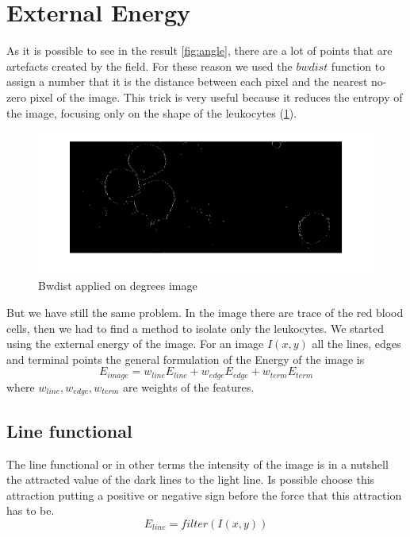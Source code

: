 \section{External Energy}
As it is possible to see in the result \ref{fig:angle}, there are a lot of points that are artefacts created by the field. For these reason we used the $bwdist$ function to assign a number that it is the distance between each pixel and the nearest no-zero pixel of the image. This trick is very useful because it reduces the entropy of the image, focusing only on the shape of the leukocytes (\ref{fig:bwdistangle}).
\begin{figure}
	\begin{center}
		\centering
		\includegraphics[scale=0.5]{img/bwdistAngle.png}
		\caption{Bwdist applied on degrees image}
		\label{fig:bwdistangle}
	\end{center}
\end{figure}
But we have still the same problem. In the image there are trace of the red blood cells, then we had to find a method to isolate only the leukocytes. We started using the external energy of the image. For an image $I(x,y)$ all the lines, edges and terminal points the general formulation of the Energy of the image is
\begin{equation}
 E_{image}=w_{line}E_{line} + w_{edge}E_{edge} + w_{term}E_{term}
\end{equation}
where $w_{line}, w_{edge}, w_{term}$ are weights of the features.

\subsection{Line functional}
The line functional or in other terms the intensity of the image is in a nutshell the attracted value of the dark lines to the light line. Is possible choose this attraction putting a positive or negative sign before the force that this attraction has to be.
\begin{equation}
	E_{{line}}=filter(I(x,y))
\end{equation}

